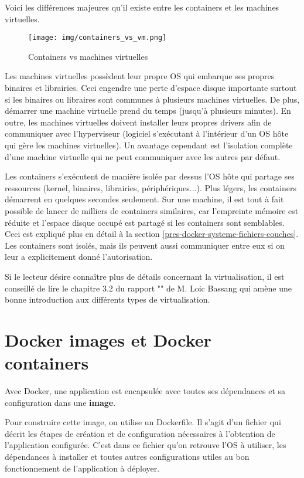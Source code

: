 Voici les différences majeures qu'il existe entre les containers et les machines virtuelles\cite{what_is_docker}.

\begin{figure}[hbtp]
\centering
\texttt{[image: img/containers\_vs\_vm.png]}
\caption{Containers vs machines virtuelles}
\end{figure}

Les machines virtuelles possèdent leur propre OS qui embarque ses propres binaires et librairies. Ceci engendre une perte d'espace disque importante surtout si les binaires ou libraires sont communes à plusieurs machines virtuelles. De plus, démarrer une machine virtuelle prend du temps (jusqu'à plusieurs minutes). En outre, les machines virtuelles doivent installer leurs propres drivers afin de communiquer avec l'hyperviseur (logiciel s'exécutant à l'intérieur d'un OS hôte qui gère les machines virtuelles). Un avantage cependant est l'isolation complète d'une machine virtuelle qui ne peut communiquer avec les autres par défaut.

Les containers s'exécutent de manière isolée par dessus l'OS hôte qui partage ses ressources (kernel, binaires, librairies, périphériques...). Plus légers, les containers démarrent en quelques secondes seulement. Sur une machine, il est tout à fait possible de lancer de milliers de containers similaires, car l'empreinte mémoire est réduite et l'espace disque occupé est partagé si les containers sont semblables. Ceci est expliqué plus en détail à la section \ref{pres-docker-systeme-fichiers-couches}. Les containers sont isolés, mais ils peuvent aussi communiquer entre eux si on leur a explicitement donné l'autorisation.

Si le lecteur désire connaître plus de détails concernant la virtualisation, il est conseillé de lire le chapitre 3.2 du rapport "\bassangPrjSemestre" de M. Loic Bassang \cite{bassang_semestre} qui amène une bonne introduction aux différents types de virtualisation.


\section{Docker images et Docker containers}
Avec Docker, une application est encapsulée avec toutes ses dépendances et sa configuration dans une \textbf{image}. 

Pour construire cette image, on utilise un Dockerfile. Il s'agit d'un fichier qui décrit les étapes de création et de configuration nécessaires à l'obtention de l'application configurée. C'est dans ce fichier qu'on retrouve l'OS à utiliser, les dépendances à installer et toutes autres configurations utiles au bon fonctionnement de l'application à déployer. 

